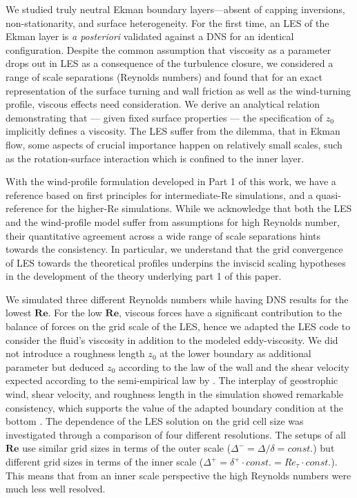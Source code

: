 \documentclass[a4paper,11pt]{article}
\newcommand{\RE}{\mathbf{Re}}
\begin{document}
We studied truly neutral Ekman boundary layers---absent of capping inversions, non-stationarity, and surface heterogeneity. For the first time, an LES of the Ekman layer is \emph{a posteriori} validated against a DNS for an identical configuration. Despite the common assumption that viscosity as a parameter drops out in LES as a consequence of the turbulence closure, we considered a range of scale separations (Reynolds numbers) and found that for an exact representation of the surface turning and wall friction as well as the wind-turning profile, viscous effects need consideration. We derive an analytical relation demonstrating that --- given fixed surface properties --- the specification of $z_0$ implicitly defines a viscosity. The LES suffer from the dilemma, that in Ekman flow, some aspects of crucial importance happen on relatively small scales, such as the rotation-surface interaction which is confined to the inner layer.

With the wind-profile formulation developed in Part 1 of this work, we have a reference based on first principles for intermediate-Re simulations, and a quasi-reference for the higher-Re simulations. While we acknowledge that both the LES and the wind-profile model suffer from assumptions for high Reynolds number, their quantitative agreement across a wide range of scale separations hints towards the consistency. In particular, we understand that the grid convergence of LES towards the theoretical profiles underpins the inviscid scaling hypotheses in the development of the theory underlying part 1 of this paper.

We simulated three different Reynolds numbers while having DNS results for the lowest $\RE$. For the low $\RE$, viscous forces have a significant contribution to the balance of forces on the grid scale of the LES, hence we adapted the LES code to consider the fluid's viscosity in addition to the modeled eddy-viscosity. We did not introduce a roughness length $z_0$ at the lower boundary as additional parameter but deduced $z_0$ according to the law of the wall and the shear velocity expected according to the semi-empirical law by \cite{spalart1989theoretical}. The interplay of geostrophic wind, shear velocity, and roughness length in the simulation showed remarkable consistency, which supports the value of the adapted boundary condition at the bottom \citep{maronga2017formulation}. The dependence of the LES solution on the grid cell size was investigated through a comparison of four different resolutions. The setups of all $\RE$ use similar grid sizes in terms of the outer scale ($\Delta^-=\Delta/\delta=const.$) but different grid sizes in terms of the inner scale ($\Delta^+=\delta^+\cdot const. = Re_\tau\cdot const.$). This means that from an inner scale perspective the high Reynolds numbers were much less well resolved.
\end{document}
